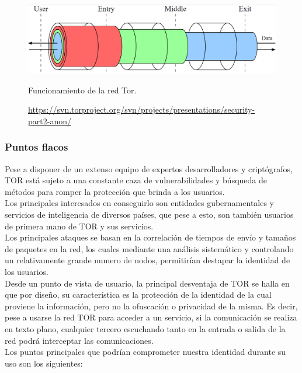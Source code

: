 
\begin{figure}[H]
	\centering
	\includegraphics[width=\textwidth]{imagenes/tor_keys}
	\caption{Funcionamiento de la red Tor.}
	\caption*{\small \url {https://svn.torproject.org/svn/projects/presentations/security-part2-anon/}}
	\label{fig:torkeys}
\end{figure}

\subsubsection {Puntos flacos}

Pese a disponer de un extenso equipo de expertos desarrolladores y criptógrafos, TOR está sujeto a una constante caza de vulnerabilidades y búsqueda de métodos para romper la protección que brinda a los usuarios. \\
Los principales interesados en conseguirlo son entidades gubernamentales y servicios de inteligencia de diversos países, que pese a esto, son también usuarios de primera mano de TOR y sus servicios. \\ 

Los principales ataques se basan en la correlación de tiempos de envío y tamaños de paquetes en la red, los cuales mediante una análisis sistemático y controlando un relativamente grande numero de nodos, permitirían destapar la identidad de los usuarios. \\

Desde un punto de vista de usuario, la principal desventaja de TOR se halla en que por diseño, su característica es la protección de la identidad de la cual proviene la información, pero no la ofuscación o privacidad de la misma. Es decir, pese a usarse la red TOR para acceder a un servicio, si la comunicación se realiza en texto plano, cualquier tercero escuchando tanto en la entrada o salida de la red podrá interceptar las comunicaciones. \\ 

Los puntos principales que podrían comprometer nuestra identidad durante su uso son los siguientes: \\

